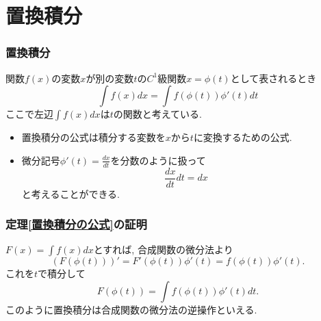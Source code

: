 
\section{置換積分}

\begin{frame}
\frametitle{置換積分}

\begin{Thm}[置換積分の公式] \label{置換積分の公式}
関数$f(x)$の変数$x$が別の変数$t$の$C^1$級関数$x=\phi(t)$として表されるとき
$$
\int f(x)dx =\int f(\phi(t))\phi'(t)dt
$$
ここで左辺$\int f(x)dx$は$t$の関数と考えている. 
\end{Thm}
\begin{itemize}
\item 置換積分の公式は積分する変数を$x$から$t$に変換するための公式. 
\item  微分記号$\phi'(t)=\frac{dx}{dt}$を分数のように扱って
 $$
 \frac{dx}{dt} dt = dx
 $$
 と考えることができる. 
 \end{itemize}
\end{frame}






\begin{frame}
\frametitle{定理\ref{置換積分の公式}の証明}

$F(x)=\int f(x)dx$とすれば, 合成関数の微分法より
$$
(F(\phi(t)))'=F'(\phi(t))\phi'(t)=f(\phi(t))\phi'(t). 
$$
これを$t$で積分して
$$
F(\phi(t))= \int f(\phi(t))\phi'(t)dt. 
$$
このように置換積分は合成関数の微分法の逆操作といえる. 

\end{frame}







